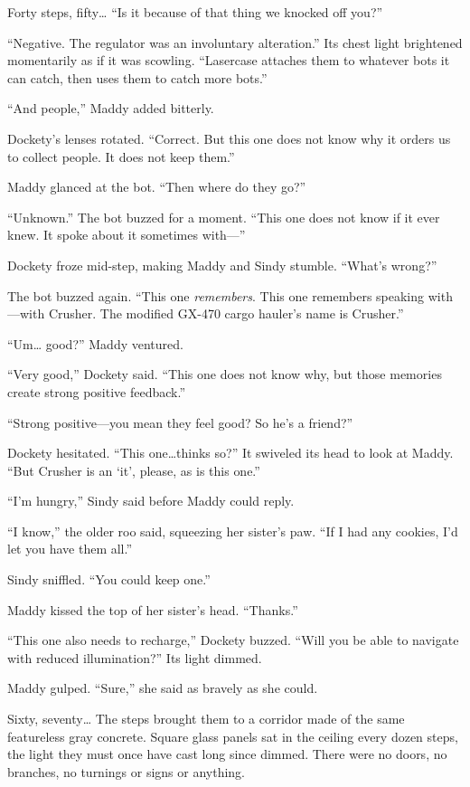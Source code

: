 \documentclass[10pt]{article}
\begin{document}
Forty steps, fifty\ldots{} ``Is it because of that thing we knocked off
you?''

``Negative. The regulator was an involuntary alteration.'' Its chest
light brightened momentarily as if it was scowling. ``Lasercase attaches
them to whatever bots it can catch, then uses them to catch more bots.''

``And people,'' Maddy added bitterly.

Dockety's lenses rotated. ``Correct. But this one does not know why it
orders us to collect people. It does not keep them.''

Maddy glanced at the bot. ``Then where do they go?''

``Unknown.'' The bot buzzed for a moment. ``This one does not know if it
ever knew. It spoke about it sometimes with---''

Dockety froze mid-step, making Maddy and Sindy stumble. ``What's
wrong?''

The bot buzzed again. ``This one \emph{remembers}. This one remembers
speaking with---with Crusher. The modified GX-470 cargo hauler's name is
Crusher.''

``Um\ldots{} good?'' Maddy ventured.

``Very good,'' Dockety said. ``This one does not know why, but those
memories create strong positive feedback.''

``Strong positive---you mean they feel good? So he's a friend?''

Dockety hesitated. ``This one\ldots{}thinks so?'' It swiveled its head
to look at Maddy. ``But Crusher is an `it', please, as is this one.''

``I'm hungry,'' Sindy said before Maddy could reply.

``I know,'' the older roo said, squeezing her sister's paw. ``If I had
any cookies, I'd let you have them all.''

Sindy sniffled. ``You could keep one.''

Maddy kissed the top of her sister's head. ``Thanks.''

``This one also needs to recharge,'' Dockety buzzed. ``Will you be able
to navigate with reduced illumination?'' Its light dimmed.

Maddy gulped. ``Sure,'' she said as bravely as she could.

Sixty, seventy\ldots{} The steps brought them to a corridor made of the
same featureless gray concrete. Square glass panels sat in the ceiling
every dozen steps, the light they must once have cast long since dimmed.
There were no doors, no branches, no turnings or signs or anything.
\end{document}
